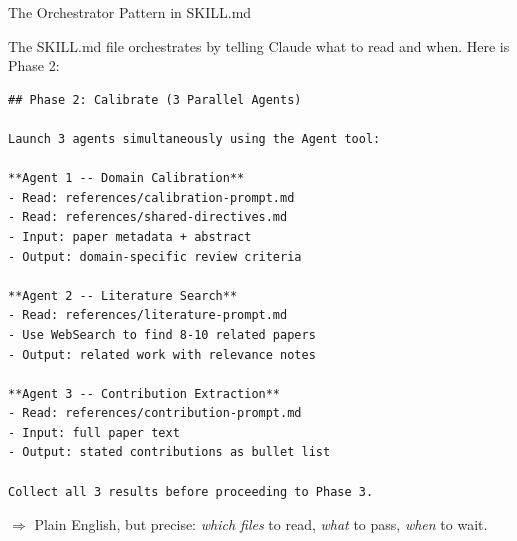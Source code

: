\documentclass[10pt,english,aspectratio=169]{beamer}
\begin{document}
\begin{frame}[fragile]{The Orchestrator Pattern in SKILL.md}

The SKILL.md file orchestrates by telling Claude what to read and when. Here is Phase 2:

\vspace{0.2cm}
\begin{lstlisting}[style=markdownstyle, basicstyle=\ttfamily\scriptsize]
## Phase 2: Calibrate (3 Parallel Agents)

Launch 3 agents simultaneously using the Agent tool:

**Agent 1 -- Domain Calibration**
- Read: references/calibration-prompt.md
- Read: references/shared-directives.md
- Input: paper metadata + abstract
- Output: domain-specific review criteria

**Agent 2 -- Literature Search**
- Read: references/literature-prompt.md
- Use WebSearch to find 8-10 related papers
- Output: related work with relevance notes

**Agent 3 -- Contribution Extraction**
- Read: references/contribution-prompt.md
- Input: full paper text
- Output: stated contributions as bullet list

Collect all 3 results before proceeding to Phase 3.
\end{lstlisting}

\vspace{0.1cm}
$\Rightarrow$ Plain English, but precise: \emph{which files} to read, \emph{what} to pass, \emph{when} to wait.

\end{frame}
\end{document}
